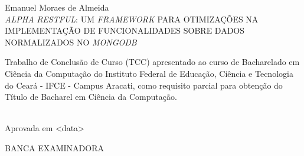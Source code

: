 \begin{folhadeaprovacao}
\vfill
\begin{center}

{Emanuel Moraes de Almeida\\}
\vspace{1.5cm}
{\textsc{\uppercase{\textit{Alpha} \textit{Restful}: Um \textit{Framework} para Otimizações na Implementação de Funcionalidades Sobre Dados Normalizados no \textit{MongoDB}}}\\}
\vspace{1.5cm}
\hspace{.45\linewidth}
\begin{minipage}{.50\linewidth}
Trabalho de Conclusão de Curso (TCC) apresentado ao curso de Bacharelado em Ciência da Computação do Instituto Federal de Educação, Ciência e Tecnologia do Ceará - IFCE - Campus Aracati, como requisito parcial para obtenção do Título de Bacharel em Ciência da Computação. 
\end{minipage}
\vspace{1.0 cm}

\end{center}

\noindent\\
{Aprovada em <data>}

\vspace{1.5 cm}
\begin{center}
{BANCA EXAMINADORA}

\end{center}
\end{folhadeaprovacao}